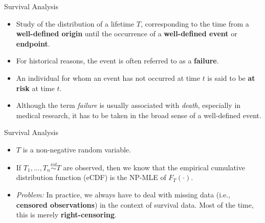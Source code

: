 \documentclass[12pt,t,handout]{beamer}
\begin{document}
\begin{frame}[c]{Survival Analysis}

\begin{center}
\begin{itemize}
  \itemsep12pt
  \item Study of the distribution of a lifetime $T$, corresponding to the time
    from a \textbf{well-defined origin} until the occurrence of a
    \textbf{well-defined event} or \textbf{endpoint}.
  \item For historical reasons, the event is often referred to as a
    \textbf{failure}.
  \item An individual for whom an event has not occurred at time $t$ is said to
    be \textbf{at risk} at time $t$.
  \item Although the term \textit{failure} is usually associated with
    \textit{death}, especially in medical research, it has to be taken in the
    broad sense of a well-defined event.
\end{itemize}
\end{center}

\note{
}

\end{frame}


\begin{frame}[c]{Survival Analysis}

\begin{center}
\begin{itemize}
  \itemsep12pt
  \item $T$ is a non-negative random variable.
  \item If $T_1, \ldots, T_n \stackrel{iid}{\sim} T$ are observed, then we know
    that the empirical cumulative distribution function (eCDF) is the NP-MLE of
    $F_T(\cdot).$
  \item \textit{Problem:} In practice, we always have to deal with missing data
    (i.e., \textbf{censored observations}) in the context of survival data. Most
    of the time, this is merely \textbf{right-censoring}.
\end{itemize}
\end{center}


\end{frame}
\end{document}
